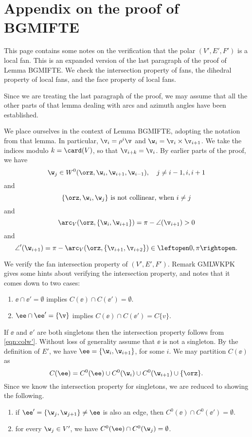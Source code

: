 
\newpage
\section{Appendix on the proof of BGMIFTE}

This page contains some notes on the verification that the polar $(V',E',F')$ is
a local fan.   This is an expanded version of  the last paragraph
of the proof of Lemma BGMIFTE.
We check the intersection property of fans, the dihedral property
of local fans, and the face property of local fans.

Since we are treating the last paragraph of the
proof, we may assume that all the other parts of that lemma dealing
with arcs and azimuth angles have been established.

We place ourselves in the context of Lemma BGMIFTE, adopting the
notation from that lemma.  
In particular, $\v_i = \rho^i\v$ and
$\w_i = \v_i \times \v_{i+1}$.  
We take the indices modulo $k=\card(V)$, so that $\v_{i+k}=\v_i$.
By earlier parts of the proof, we have
\begin{equation}\label{eqn:wj'}
\w_j\in W^0(\orz,\w_{i},\w_{i+1},\w_{i-1}),\quad j\ne i-1, i, i+1
\end{equation}
and
\begin{equation}\label{eqn:colw'}
\{\orz,\w_i,\w_j\} \text{ is not collinear, when } i\ne j
\end{equation}  
and
\begin{equation}\label{eqn:arcV'}
\arc_V(\orz,\{\w_i,\w_{i+1}\}) 
=\pi - \angle(\v_{i+1}) >0
\end{equation}
and
\begin{equation}\label{eqn:angle'}
\angle'(\w_{i+1}) 
=\pi -\arc_V(\orz,\{\v_{i+1},\v_{i+2}\})  \in\leftopen 0,\pi\rightopen.
\end{equation}

We verify the fan intersection property of $(V',E',F')$.  Remark GMLWKPK gives
some hints about verifying the intersection property, and notes that it comes
down to two cases:
\begin{enumerate}
\item $\ee\cap \ee' = \emptyset$ implies $C(\ee)\cap C(\ee') = \emptyset$.
\item $\ee\cap\ee' = \{\v\}$ implies $C(\ee)\cap C(\ee') = C\{v\}$.
\end{enumerate}
If $\ee$ and $\ee'$ are both singletons then the intersection property
follows from \eqref{eqn:colw'}.  Without loss of generality assume that $\ee$ is
not a singleton.  By the definition of $E'$, we have 
 $\ee=\{\w_i,\w_{i+1} \}$, for some $i$.  We may partition $C(\ee)$ as
\[
C(\ee) = C^0(\ee) \cup C^0(\w_i) \cup C^0(\w_{i+1})\cup \{\orz\}.
\]
Since we know the intersection property for singletons, we are reduced to showing
the following.
\begin{enumerate}
\item if $\ee'=\{\w_j,\w_{j+1}\}\ne\ee$ is also an edge, then  $C^0(\ee)\cap C^0(\ee')=\emptyset$.
\item for every $\w_j\in V'$, we have $C^0(\ee) \cap C^0(\w_j)=\emptyset$.
\end{enumerate}

